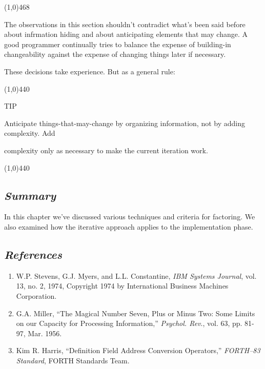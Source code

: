 \documentclass{book}
\begin{document}
\noindent
\line(1,0){468}

\bigskip

\noindent
The observations in this section shouldn't contradict what's been said before about infrmation hiding and about anticipating elements that may change. A good programmer continually tries to balance the expense of building-in changeability against the expense of changing things later if necessary.

These decisions take experience. But as a general rule:

\line(1,0){440} 

TIP 

Anticipate things-that-may-change by organizing information, not by adding complexity. Add 

complexity only as necessary to make the current iteration work.

\line(1,0){440}

\subsection*{
	\textbf{
		\textit{Summary}}}
		
\noindent
In this chapter we've discussed various techniques and criteria for factoring. We also examined how the iterative approach applies to the implementation phase.

\subsection*{
	\textbf{
		\textit{References}}}
		
\begin{enumerate}
\item W.P. Stevens, G.J. Myers, and L.L. Constantine, \textit{ IBM Systems Journal}, vol. 13, no. 2, 1974, Copyright 1974 by International Business Machines Corporation.
\item G.A. Miller, ``The Magical Number Seven, Plus or Minus Two: Some Limits on our Capacity for Processing Information,'' \textit{Psychol. Rev}., vol. 63, pp. 81-97, Mar. 1956.
\item Kim R. Harris, ``Definition Field Address Conversion Operators,'' \textit{FORTH--83 Standard}, FORTH Standards Team.
\end{enumerate}
\end{document}
